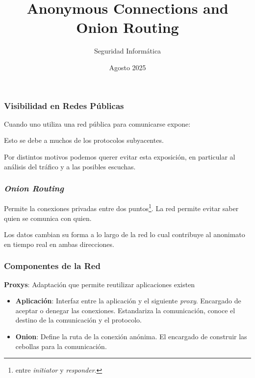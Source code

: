 \documentclass{beamer}
\title[Onion Routing] %
{Anonymous Connections and Onion Routing}
\subtitle{
}
\author[] %
{
    Seguridad Informática 
}
\institute[LCC - FCEIA] %
{
    Facultad de Ciencias Exactas, Ingeniería y Agrimensura\\Universidad Nacional de Rosario
}
\date[Seguridad Informática] %
{Agosto 2025}
\newcommand { \onion } {\textit{Onion Routing}\xspace}
\newcommand{\vspc}{\vspace{0.5cm}}
\begin{document}
\frame{
    \titlepage
}

\begin{frame}
    \frametitle{Visibilidad en Redes Públicas}
    Cuando uno utiliza una red pública para comunicarse expone:
    \begin{itemize}
    \end{itemize}

    Esto se debe a muchos de los protocolos subyacentes.

    \pause

    Por distintos motivos podemos querer evitar esta exposición, en particular al análisis del tráfico y a las posibles escuchas.

\end{frame}

\begin{frame}
    \frametitle{\onion}

    Permite la conexiones privadas entre dos puntos\footnote{entre \textit{initiator} y \textit{responder}.}. La red permite evitar saber quien se comunica con quien.

    \vspc

    Los datos cambian su forma a lo largo de la red lo cual contribuye al anonimato en tiempo real en ambas direcciones.

\end{frame}

\begin{frame}
    \frametitle{Componentes de la Red}
    \textbf{Proxys}: Adaptación que permite reutilizar aplicaciones existen
    \begin{itemize}
        \item \textbf{Aplicación}: Interfaz entre la aplicación y el siguiente \textit{proxy}. Encargado de aceptar o denegar las conexiones. Estandariza la comunicación, conoce el destino de la comunicación y el protocolo.
        \item \textbf{Onion}: Define la ruta de la conexión anónima. El encargado de construir las cebollas para la comunicación.
    \end{itemize}
    
    
\end{frame}
\end{document}
